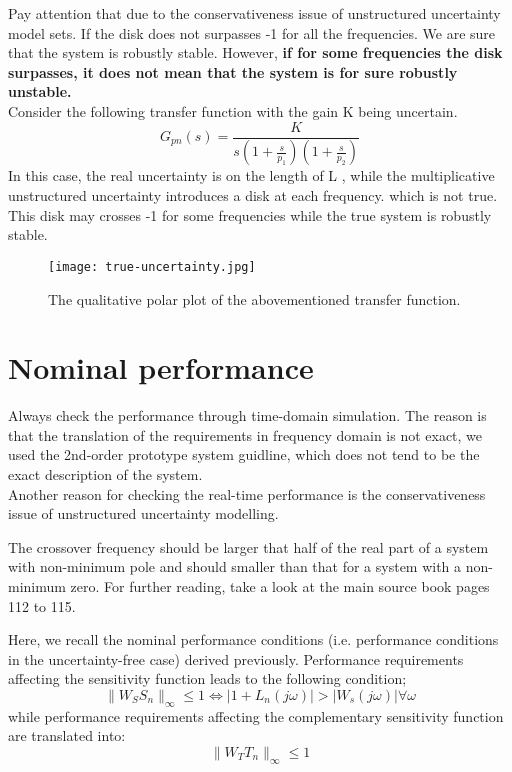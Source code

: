 \begin{QandAbox}
Pay attention that due to the conservativeness issue of unstructured uncertainty model sets. If the disk does not surpasses -1 for all the frequencies. We are sure that the system is robustly stable. However, \textbf{if for some frequencies the disk surpasses, it does not mean that the system is for sure robustly unstable.}\\

    Consider the following transfer function with the gain K being uncertain.
\[
G_{pn}(s) = \frac{K}{s(1+\frac{s}{p_1})(1+\frac{s}{p_2})}
\] 
In this case, the real uncertainty is on the length of L , while the multiplicative unstructured uncertainty introduces a disk at each frequency. which is not true. This disk may crosses -1 for some frequencies while the true system is robustly stable.

\begin{figure}[H]
    \centering
    \texttt{[image: true-uncertainty.jpg]}
    \caption{The qualitative polar plot of the abovementioned transfer function.}
\end{figure}
   

\end{QandAbox}
\section{Nominal performance}
\begin{factbox}
Always check the performance through time-domain simulation. The reason is that the translation of the requirements in frequency domain is not exact, we used the 2nd-order prototype system guidline, which does not tend to be the exact description of the system. \\
Another reason for checking the real-time performance is the conservativeness issue of unstructured uncertainty modelling.
\end{factbox}

\begin{QandAbox}
The crossover frequency should be larger that half of the real part of a system with non-minimum pole and should smaller than that for a system with a non-minimum zero. For further reading, take a look at the main source book pages 112 to 115.
\end{QandAbox}

Here, we recall the nominal performance conditions (i.e. performance conditions in the uncertainty-free case) derived previously. Performance requirements affecting the sensitivity function leads to the following condition;
\[
\|W_SS_n\|_\infty \leq 1 \Leftrightarrow |1 + L_n(j\omega)| > |W_s(j\omega)| \forall \omega
\]
while performance requirements affecting the complementary sensitivity function are translated into:
\[
\|W_TT_n\|_\infty \leq 1 
\]

